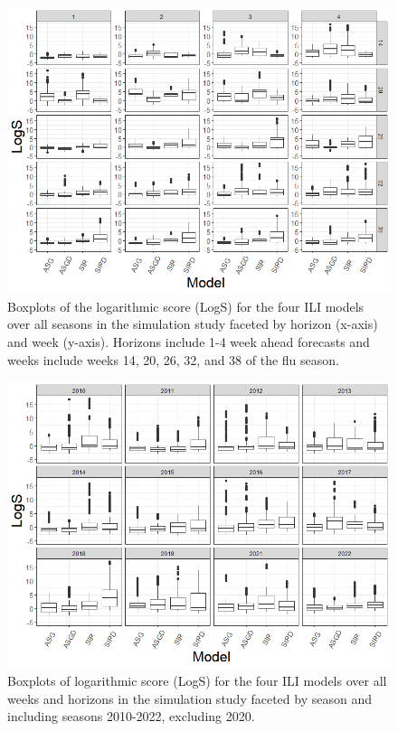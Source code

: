 \documentclass{article}
\begin{document}
\begin{figure}[hbt!]
    \centering
    \includegraphics[scale=.4]{Images/logs_by_week_horizon.png}
    \caption{Boxplots of the logarithmic score (LogS) for the four ILI models over all seasons in the simulation study faceted by horizon (x-axis) and week (y-axis). Horizons include 1-4 week ahead forecasts and weeks include weeks 14, 20, 26, 32, and 38 of the flu season.}
    \label{fig:logs_by_week_horizon}
\end{figure}


\begin{figure}[hbt!]
    \centering
    \includegraphics[scale=.5]{Images/logs_by_season.png}
    \caption{Boxplots of logarithmic score (LogS) for the four ILI models over all weeks and horizons in the simulation study faceted by season and including seasons 2010-2022, excluding 2020.}
    \label{fig:logs_by_season}
\end{figure}
\end{document}
